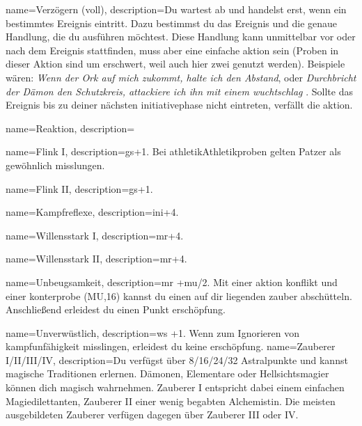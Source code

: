 {
    name={Verzögern (voll)},
    description={Du wartest ab und handelst erst, wenn ein bestimmtes Ereignis eintritt. Dazu bestimmst du das Ereignis und die genaue Handlung, die du ausführen möchtest. Diese Handlung kann unmittelbar vor oder nach dem Ereignis stattfinden, muss aber eine einfache \gls{aktion} sein (Proben in dieser Aktion sind um  erschwert, weil auch hier zwei  genutzt werden). Beispiele wären: \textit{Wenn der Ork auf mich zukommt, halte ich den Abstand}, oder \textit{Durchbricht der Dämon den Schutzkreis, attackiere ich ihn mit einem \gls{wuchtschlag} }. Sollte das Ereignis bis zu deiner nächsten \gls{initiativephase} nicht eintreten, verfällt die \gls{aktion}.}}

{
    name={Reaktion},
    description={}}
        
        
        
        
        
        

{
    name={Flink I},
    description={\gls{gs}+1. Bei \gls{athletik}{Athletikproben} gelten Patzer als gewöhnlich misslungen.}}

{
    name={Flink II},
    description={\gls{gs}+1.}}

{
    name={Kampfreflexe},
    description={\gls{ini}+4.}}

{
    name={Willensstark I},
    description={\gls{mr}+4.}}

{
    name={Willensstark II},
    description={\gls{mr}+4.}}

{
    name={Unbeugsamkeit},
    description={\gls{mr} +\gls{mu}/2. Mit einer \gls{aktion} \gls{konflikt} und einer \gls{konterprobe} (MU,16) kannst du einen auf dir liegenden \gls{zauber} abschütteln. Anschließend erleidest du einen Punkt \gls{erschöpfung}.}}

{
    name={Unverwüstlich},
    description={\gls{ws} +1. Wenn  zum Ignorieren von \gls{kampfunfähigkeit} misslingen, erleidest du keine \gls{erschöpfung}.}}
{
	name={Zauberer I/II/III/IV},
	description={Du verfügst über 8/16/24/32 Astralpunkte und kannst magische Traditionen erlernen. Dämonen, Elementare oder Hellsichtsmagier können dich magisch wahrnehmen. Zauberer I entspricht dabei einem einfachen Magiedilettanten, Zauberer II einer wenig begabten Alchemistin. Die meisten ausgebildeten Zauberer verfügen dagegen über Zauberer III oder IV.}
}

